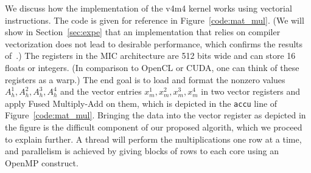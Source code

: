 \documentclass[10pt,conference,compsocconf]{IEEEtran}
\begin{document}
We discuss how the implementation of the v4m4 kernel works using
vectorial instructions. The code is given for reference in
Figure~\ref{code:mat_mul}. (We will show in Section~\ref{sec:expe}
that an implementation that relies on compiler vectorization does not lead
to desirable performance, which confirms the results
of~\cite{Saule13-ARXIV}.) The registers in the MIC architecture are
512 bits wide and can store 16 floats or integers. (In comparison to
OpenCL or CUDA, one can think of these registers as a warp.) The end
goal is to load and format the nonzero values $A_h^1,A_h^2,A_h^3,A_h^4$
and the vector entries $x_m^1,x_m^2,x_m^3,x_m^4$ in two vector registers and 
apply Fused Multiply-Add on them, which is depicted in the {\tt accu} line of 
Figure~\ref{code:mat_mul}. Bringing the data into the vector
register as depicted in the figure is the difficult component of our 
proposed algorith, which we proceed to explain further. 
A thread will perform the multiplications one row at a time,
and parallelism is achieved by giving blocks of rows to each core
using an OpenMP construct.
\end{document}
